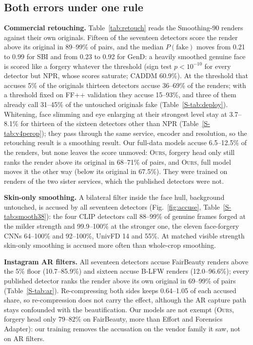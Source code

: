 \documentclass[conference]{IEEEtran}
\newcommand{\oursB}{\textsc{Ours}, forgery head only}
\newcommand{\oursF}{\textsc{Ours}, full model}
\begin{document}
\subsection{Both errors under one rule}
\label{sec:accuse}
\label{sec:measure}
\textbf{Commercial retouching.} Table~\ref{tab:retouch} reads the Smoothing-90 renders against their own originals. Fifteen
of the seventeen detectors score the render above its original in 89--99\% of pairs, and the median $P(\text{fake})$ moves
from 0.21 to 0.99 for SBI and from 0.23 to 0.92 for GenD: a heavily smoothed genuine face is scored like a forgery whatever the
threshold (sign test $p<10^{-10}$ for every detector but NPR, whose scores saturate; CADDM 60.9\%). At the threshold that
accuses 5\% of the originals thirteen detectors accuse 36--69\% of the renders; with a threshold fixed on FF++ validation they
accuse 15--93\%, and three of them already call 31--45\% of the untouched originals fake (Table~\ref{S-tab:deploy}).
Whitening, face slimming and eye enlarging at their strongest level stay at 3.7--8.1\% for thirteen of the sixteen detectors
other than NPR (Table~\ref{S-tab:v4perop}); they pass through the same service, encoder and resolution, so the retouching
result is a smoothing result. Our full-data models accuse 6.5--12.5\% of the renders, but none leaves the score unmoved:
\oursB{} still ranks the render above its original in 68--71\% of pairs, and \oursF{} moves it the other way (below its
original in 67.5\%). They were trained on renders of the two sister services, which the published detectors were not.

\textbf{Skin-only smoothing.} A bilateral filter inside the face hull, background untouched, is accused by all seventeen
detectors (Fig.~\ref{fig:accuse}, Table~\ref{S-tab:smooth38}): the four CLIP detectors call 88--99\% of genuine frames forged at
the milder strength and 99.9--100\% at the stronger one, the eleven face-forgery CNNs 64--100\% and 92--100\%, UnivFD 14 and
55\%. At matched visible strength skin-only smoothing is accused more often than whole-crop smoothing.

\textbf{Instagram AR filters.} All seventeen detectors accuse FairBeauty renders above the 5\% floor (10.7--85.9\%) and sixteen
accuse B-LFW renders (12.0--96.6\%); every published detector ranks the render above its own original in 69--99\% of pairs
(Table~\ref{S-tab:ar}). Re-compressing both sides keeps 0.64--1.05 of each accused share, so re-compression does not carry the
effect, although the AR capture path stays confounded with the beautification. Our models are not exempt (\oursB{} 79--82\%
on FairBeauty, more than Effort and Forensics Adapter): our training removes the accusation on the vendor family it saw, not on
AR filters.
\end{document}
